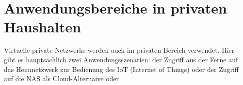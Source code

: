 \section{Anwendungsbereiche in privaten Haushalten}

Virtuelle private Netzwerke werden auch im privaten Bereich  verwendet. Hier gibt es hauptsächlich zwei Anwendungsszenarien: der Zugriff aus der Ferne auf das Heimnetzwerk zur Bedienung des IoT (Internet of Things) oder der Zugriff auf die NAS als Cloud-Alternaive oder






